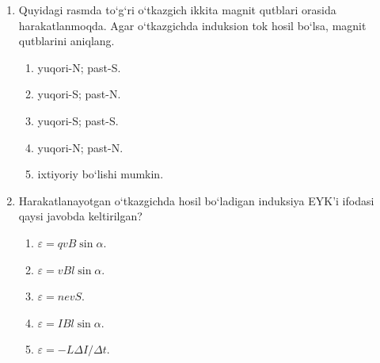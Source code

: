 \begin{enumerate}
\begin{tikzpicture}[thick, scale=1.5]
\end{tikzpicture}

\begin{enumerate}[label=\Alph*)]
\item chapga.
\item pastga.
\item o‘ngga.
\item tepaga.
\item TJY.
\end{enumerate}

\item Quyidagi rasmda to‘g‘ri o‘tkazgich ikkita magnit qutblari orasida harakatlanmoqda. Agar o‘tkazgichda induksion tok hosil bo‘lsa, magnit qutblarini aniqlang.


\begin{enumerate}[label=\Alph*)]
\item yuqori-N; past-S.
\item yuqori-S; past-N.
\item yuqori-S; past-S.
\item yuqori-N; past-N.
\item ixtiyoriy bo‘lishi mumkin.
\end{enumerate}

\item Harakatlanayotgan o‘tkazgichda hosil bo‘ladigan induksiya EYK’i ifodasi qaysi javobda keltirilgan?
\begin{enumerate}[label=\Alph*)]
\item $\varepsilon=qvB\sin\alpha$.
\item $\varepsilon=vBl\sin\alpha$.
\item $\varepsilon=nevS$.
\item $\varepsilon=IBl\sin\alpha$.
\item $\varepsilon=-L\Delta I/\Delta t$.
\end{enumerate}


\end{enumerate}
